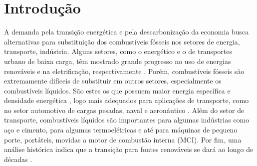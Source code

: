 \section{Introdução} \label{sec:intro}





A demanda pela transição energética e pela descarbonização da economia busca alternativas para substituição dos combustíveis fósseis nos setores de energia, transporte, indústria. 
Alguns setores, como o energético e o de transportes urbano de baixa carga, têm mostrado grande progresso no uso de energias renováveis e na eletrificação, respectivamente \cite{MasriA2021}. 
Porém, combustíveis fósseis são extremamente difíceis de substituir em outros setores, especialmente os combustíveis líquidos.
São estes os que possuem maior energia específica e densidade energética \cite{Bergthorson2017,Julien2017}, logo mais adequados para aplicações de transporte, como no setor automotivo de cargas pesadas, naval e aeronáutico \cite{MasriA2021}.
Além do setor de transporte, combustíveis líquidos são importantes para algumas indústrias como aço e cimento, para algumas termoelétricas e até para máquinas de pequeno porte, portáteis, movidas a motor de combustão interna (MCI).
Por fim, uma análise histórica indica que a transição para fontes renováveis se dará ao longo de décadas \cite{MasriA2021}.


